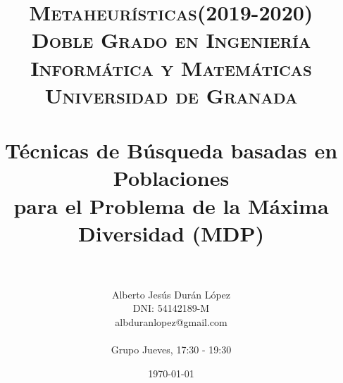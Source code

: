 

\usepackage{algpseudocode}
\usepackage[spanish]{babel}
\usepackage{varwidth}
\usepackage{hyperref}

\usepackage[spanish,onelanguage]{algorithm2e} %
\usepackage[lmargin=3.81cm,tmargin=2.54cm,rmargin=2.54cm,bmargin=2.52cm]{geometry}


\title{	
\normalfont \normalsize 
\textsc{\textbf{Metaheurísticas(2019-2020)} \\ Doble Grado en Ingeniería Informática y Matemáticas \\ Universidad de Granada} \\ [25pt] %
\horrule{0.5pt} \\[0.4cm] %
\huge Técnicas de Búsqueda basadas en Poblaciones \\ para el Problema de la Máxima Diversidad  (MDP) \\ %
\horrule{2pt} \\[0.5cm] %
}
\author{Alberto Jesús Durán López \\ 
DNI: 54142189-M \\
albduranlopez@gmail.com \\
\hfill \break \hspace{1cm}\\
Grupo Jueves, 17:30 - 19:30 } %


\date{\normalsize\today} %




\maketitle %

\newpage %

\tableofcontents %

